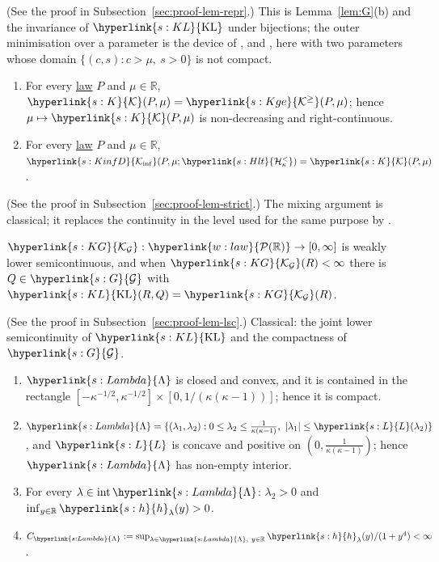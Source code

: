 \documentclass[11pt]{article}
\newcommand{\R}{\mathbb{R}}
\newcommand{\Pspace}{\term{w:law}{\mathcal{P}(\mathbb{R})}}
\newcommand{\sy}[2]{{\hyperlink{#1}{#2}}}
\newcommand{\term}[2]{\hyperlink{#1}{#2}}
\newcommand{\KL}{\sy{s:KL}{\mathrm{KL}}}
\newcommand{\Kinf}{\sy{s:KinfD}{\mathcal{K}_{\inf}}}
\newcommand{\Hlt}{\sy{s:Hlt}{\mathcal{H}^{<}_{\kappa}}}
\newcommand{\Kc}{\sy{s:K}{\mathcal{K}}}
\newcommand{\Kge}{\sy{s:Kge}{\mathcal{K}^{\ge}}}
\newcommand{\Gk}{\sy{s:G}{\mathcal{G}}}
\newcommand{\KG}{\sy{s:KG}{\mathcal{K}_{\mathcal{G}}}}
\newcommand{\hl}{\sy{s:h}{h}}
\newcommand{\Lam}{\sy{s:Lambda}{\Lambda}}
\newcommand{\Lw}{\sy{s:L}{L}}
\begin{document}
(See the proof in Subsection~\ref{sec:proof-lem-repr}.) This is Lemma~\ref{lem:G}(b) and the invariance of
$\KL$ under bijections; the outer minimisation over a parameter is the device of
\citet[Theorem~3.4]{AKJ21}, \citet[Section~6.10]{A22} and \citet[Appendix~D.5]{BSH23}, here with two parameters
whose domain $\{(c,s):c>\mu,\ s>0\}$ is not compact.

\begin{lemma}\label{lem:strict}
\begin{enumerate}[label=(\alph*)]
  \item For every \term{w:law}{law} $P$ and $\mu\in\R$, $\Kc(P,\mu)=\Kge(P,\mu)$; hence $\mu\mapsto\Kc(P,\mu)$ is non-decreasing and
  right-continuous.
  \item For every \term{w:law}{law} $P$ and $\mu\in\R$, $\Kinf(P,\mu;\Hlt)=\Kc(P,\mu)$.
\end{enumerate}
\end{lemma}

(See the proof in Subsection~\ref{sec:proof-lem-strict}.) The mixing argument is classical; it replaces the
continuity in the level used for the same purpose by \citet[Lemma~2]{HT10}.

\begin{lemma}\label{lem:lsc}
$\KG:\Pspace\to[0,\infty]$ is weakly lower semicontinuous, and when $\KG(R)<\infty$ there is $Q\in\Gk$ with
$\KL(R,Q)=\KG(R)$.
\end{lemma}

(See the proof in Subsection~\ref{sec:proof-lem-lsc}.) Classical: the joint lower semicontinuity of $\KL$
and the compactness of $\Gk$.

\begin{lemma}\label{lem:lambda}
\begin{enumerate}[label=(\alph*)]
  \item $\Lam$ is closed and convex, and it is contained in the rectangle
  $[-\kappa^{-1/2},\kappa^{-1/2}]\times[0,1/(\kappa(\kappa-1))]$; hence it is compact.
  \item $\Lam=\{(\lambda_1,\lambda_2):0\le\lambda_2\le\frac1{\kappa(\kappa-1)},\ |\lambda_1|\le\Lw(\lambda_2)\}$, and $\Lw$ is concave and
  positive on $(0,\frac1{\kappa(\kappa-1)})$; hence $\Lam$ has non-empty interior.
  \item For every $\lambda\in\mathrm{int}\,\Lam$: $\lambda_2>0$ and $\inf_{y\in\R}\hl_\lambda(y)>0$.
  \item $C_\Lam:=\sup_{\lambda\in\Lam,\ y\in\R}\hl_\lambda(y)/(1+y^4)<\infty$.
\end{enumerate}
\end{lemma}
\end{document}
